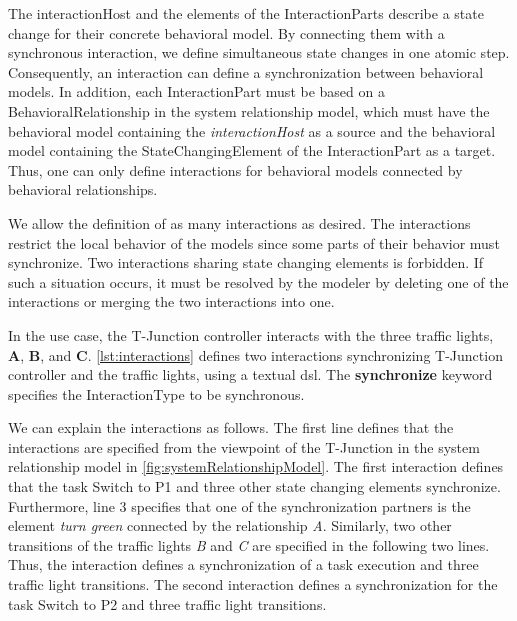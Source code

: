 \documentclass{jot}
\begin{document}
The \textsf{interactionHost} and the elements of the \textsf{InteractionPart}s describe a state change for their concrete behavioral model.
By connecting them with a synchronous interaction, we define simultaneous state changes in one atomic step. 
Consequently, an interaction can define a synchronization between behavioral models.
In addition, each \textsf{InteractionPart} must be based on a \textsf{BehavioralRelationship} in the system relationship model, which must have the behavioral model containing the \textit{interactionHost} as a source and the behavioral model containing the \textsf{StateChangingElement} of the \textsf{InteractionPart} as a target.
Thus, one can only define interactions for behavioral models connected by behavioral relationships.

We allow the definition of as many interactions as desired.
The interactions restrict the local behavior of the models since some parts of their behavior must synchronize.
Two interactions sharing state changing elements is forbidden.
If such a situation occurs, it must be resolved by the modeler by deleting one of the interactions or merging the two interactions into one.

In the use case, the T-Junction controller interacts with the three traffic lights, \textbf{A}, \textbf{B}, and \textbf{C}.
\autoref{lst:interactions} defines two interactions synchronizing T-Junction controller and the traffic lights, using a textual \gls*{dsl}.
The \textbf{synchronize} keyword specifies the \textsf{InteractionType} to be \textsf{synchronous}.



We can explain the interactions as follows.
The first line defines that the interactions are specified from the viewpoint of the T-Junction in the system relationship model in \autoref{fig:systemRelationshipModel}.
The first interaction defines that the task \textsf{Switch to P1} and three other state changing elements synchronize.
Furthermore, line 3 specifies that one of the synchronization partners is the element \textit{turn green} connected by the relationship \textit{A}.
Similarly, two other transitions of the traffic lights \textit{B} and \textit{
C} are specified in the following two lines.
Thus, the interaction defines a synchronization of a task execution and three traffic light transitions. 
The second interaction defines a synchronization for the task \textsf{Switch to P2} and three traffic light transitions.
\end{document}
